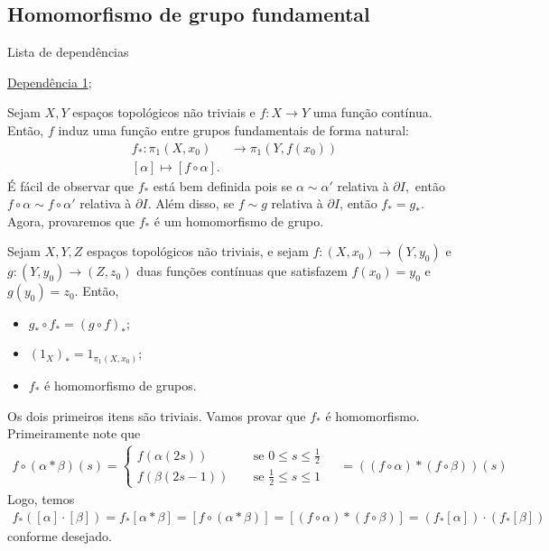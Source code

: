 \subsection{Homomorfismo de grupo fundamental}
\label{hom-grupo-fundamental}
\begin{titlemize}{Lista de dependências}
	\item \hyperref[grupo-fundamental-def]{Dependência 1};\\ %
\end{titlemize}
Sejam $X,Y$ espaços topológicos não triviais e $f:X\rightarrow Y$ uma função contínua. Então, $f$ induz uma função entre grupos fundamentais de forma natural:
\begin{align*}
    f_*:\pi_1(X,x_0)&\longrightarrow\pi_1(Y,f(x_0))\\
    [\alpha]\longmapsto [f\circ \alpha].
\end{align*}
É fácil de observar que $f_*$ está bem definida pois se $\alpha\sim \alpha'$ relativa à $\partial I,$ então $f\circ \alpha\sim f\circ \alpha'$ relativa à $\partial I.$ Além disso, se $f\sim g$ relativa à $\partial I$, então $f_*=g_*.$ Agora, provaremos que $f_*$ é um homomorfismo de grupo.
\begin{prop}
    Sejam $X,Y,Z$ espaços topológicos não triviais, e sejam $f:(X,x_0)\rightarrow (Y,y_0)$ e $g:(Y,y_0)\rightarrow (Z,z_0)$ duas funções contínuas que satisfazem $f(x_0)=y_0$ e $g(y_0)=z_0.$ Então, 
    \begin{itemize}
        \item $g_*\circ f_*=(g\circ f)_*;$
        \item $(1_X)_*=1_{\pi_1(X,x_0)};$
        \item $f_*$ é homomorfismo de grupos.
    \end{itemize}
\end{prop}
    
\begin{dem}
    Os dois primeiros itens são triviais. Vamos provar que $f_*$ é homomorfismo. Primeiramente note que 
    \begin{align*}
        f\circ (\alpha*\beta)(s)=\begin{cases}
            f(\alpha(2s))&\;\;\;\mbox{ se }0\le s\le \frac{1}{2}\\
            f(\beta(2s-1))&\;\;\;\mbox{ se }\frac{1}{2}\le s\le 1
        \end{cases}\;\;\;\;= ((f\circ\alpha)*(f\circ \beta))(s)
    \end{align*}
    Logo, temos
    \begin{align*}
        f_*([\alpha]\cdot [\beta])=f_*[\alpha*\beta]=[f\circ (\alpha*\beta)]=[(f\circ\alpha)*(f\circ\beta)]=(f_*[\alpha])\cdot (f_*[\beta])
    \end{align*}
    conforme desejado.
\end{dem}

